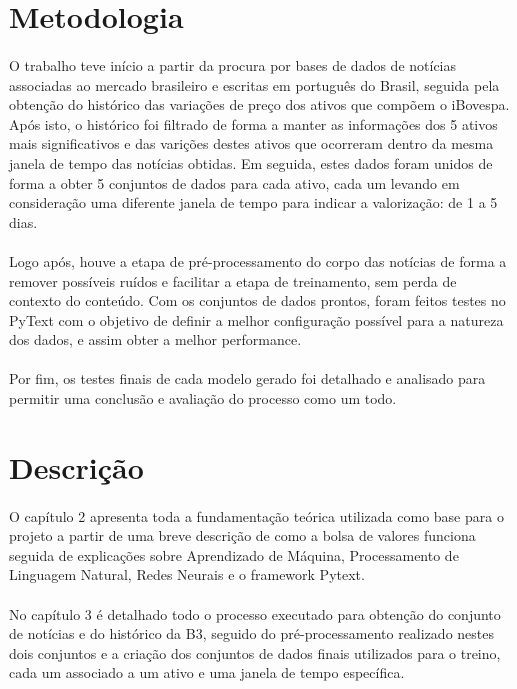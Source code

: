 \documentclass[grad,numbers]{coppe}
\begin{document}
		\section{Metodologia}
			\paragraph{}O trabalho teve início a partir da procura por bases de dados de notícias associadas ao mercado brasileiro e escritas em português do Brasil, seguida pela obtenção do histórico das variações de preço dos ativos que compõem o iBovespa. Após isto, o histórico foi filtrado de forma a manter as informações dos 5 ativos mais significativos e das varições destes ativos que ocorreram dentro da mesma janela de tempo das notícias obtidas. Em seguida, estes dados foram unidos de forma a obter 5 conjuntos de dados para cada ativo, cada um levando em consideração uma diferente janela de tempo para indicar a valorização: de 1 a 5 dias.
			\paragraph{}Logo após, houve a etapa de pré-processamento do corpo das notícias de forma a remover possíveis ruídos e facilitar a etapa de treinamento, sem perda de contexto do conteúdo. Com os conjuntos de dados prontos, foram feitos testes no PyText com o objetivo de definir a melhor configuração possível para a natureza dos dados, e assim obter a melhor performance.
			\paragraph{}Por fim, os testes finais de cada modelo gerado foi detalhado e analisado para permitir uma conclusão e avaliação do processo como um todo.

		\section{Descrição}
			\paragraph{}O capítulo 2 apresenta toda a fundamentação teórica utilizada como base para o projeto a partir de uma breve descrição de como a bolsa de valores funciona seguida de explicações sobre Aprendizado de Máquina, Processamento de Linguagem Natural, Redes Neurais e o framework Pytext.
			\paragraph{}No capítulo 3 é detalhado todo o processo executado para obtenção do conjunto de notícias e do histórico da B3, seguido do pré-processamento realizado nestes dois conjuntos e a criação dos conjuntos de dados finais utilizados para o treino, cada um associado a um ativo e uma janela de tempo específica.
\end{document}
